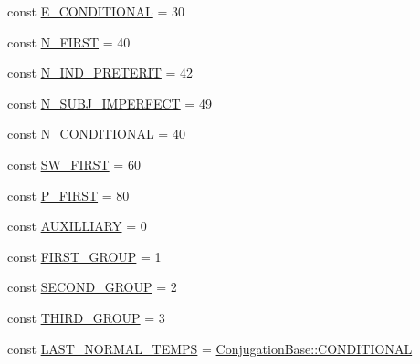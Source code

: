 \begin{DoxyCompactItemize}
\item 
const \hyperlink{classConjugationBase_a9bc888695350391f4d6da8fc191679c4}{E\+\_\+\+C\+O\+N\+D\+I\+T\+I\+O\+N\+AL} = 30
\item 
const \hyperlink{classConjugationBase_a109b61ea3f44b885131acc8cd2cc1041}{N\+\_\+\+F\+I\+R\+ST} = 40
\item 
const \hyperlink{classConjugationBase_ace5ce9108e8d34a8111cd51dbe9c3598}{N\+\_\+\+I\+N\+D\+\_\+\+P\+R\+E\+T\+E\+R\+IT} = 42
\item 
const \hyperlink{classConjugationBase_a4b0123c72fd74dfbfd3fa42d71bd7e39}{N\+\_\+\+S\+U\+B\+J\+\_\+\+I\+M\+P\+E\+R\+F\+E\+CT} = 49
\item 
const \hyperlink{classConjugationBase_a66898e8176a1e2c5aacad8657b90df08}{N\+\_\+\+C\+O\+N\+D\+I\+T\+I\+O\+N\+AL} = 40
\item 
const \hyperlink{classConjugationBase_aadfcc5e449ab900e86244bcfdd8add79}{S\+W\+\_\+\+F\+I\+R\+ST} = 60
\item 
const \hyperlink{classConjugationBase_ac632d52e6076cf1bb490c82291d4c76f}{P\+\_\+\+F\+I\+R\+ST} = 80
\item 
const \hyperlink{classConjugationBase_a997e57538ff7276bae361d1333f11d11}{A\+U\+X\+I\+L\+L\+I\+A\+RY} = 0
\item 
const \hyperlink{classConjugationBase_a98dfd89993e82fd8bd1cc855dac980fc}{F\+I\+R\+S\+T\+\_\+\+G\+R\+O\+UP} = 1
\item 
const \hyperlink{classConjugationBase_aed0c839ab301efe958079fac4bc96811}{S\+E\+C\+O\+N\+D\+\_\+\+G\+R\+O\+UP} = 2
\item 
const \hyperlink{classConjugationBase_a15fb84852952c270f80139517000d263}{T\+H\+I\+R\+D\+\_\+\+G\+R\+O\+UP} = 3
\item 
const \hyperlink{classConjugationBase_a611f1018ef9d7b1fb76ef25864bc09b9}{L\+A\+S\+T\+\_\+\+N\+O\+R\+M\+A\+L\+\_\+\+T\+E\+M\+PS} = \hyperlink{classConjugationBase_aac0359d9a8bb66ea04612b7f14d43c50}{Conjugation\+Base\+::\+C\+O\+N\+D\+I\+T\+I\+O\+N\+AL}
\end{DoxyCompactItemize}
